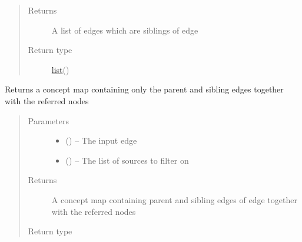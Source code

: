 \documentclass[letterpaper,10pt,english]{sphinxmanual}
\begin{document}
\begin{fulllineitems}
\begin{fulllineitems}
\begin{quote}
\begin{description}
\begin{itemize}
\end{itemize}

\item[{Returns}] \leavevmode
A list of edges which are siblings of edge

\item[{Return type}] \leavevmode
\href{https://docs.python.org/2/library/functions.html\#list}{list}({\hyperref[\detokenize{edge:module-edge}]{}})

\end{description}\end{quote}

\end{fulllineitems}


\begin{fulllineitems}
\label{\detokenize{concept_map:concept_map.ConceptMap.get_partial_map}}
Returns a concept map containing only the parent and sibling edges together with the referred nodes
\begin{quote}\begin{description}
\item[{Parameters}] \leavevmode\begin{itemize}
\item {} 
 ({\hyperref[\detokenize{edge:edge.Edge}]{}}) -- The input edge

\item {} 
 (\href{https://docs.python.org/2/library/functions.html\#list}{}\sphinxstyleliteralemphasis{(}\href{https://docs.python.org/2/library/string.html\#module-string}{}\sphinxstyleliteralemphasis{)}\sphinxstyleliteralemphasis{}) -- The list of sources to filter on

\end{itemize}

\item[{Returns}] \leavevmode
A concept map containing parent and sibling edges of edge together with the referred nodes

\item[{Return type}] \leavevmode
{\hyperref[\detokenize{concept_map:concept_map.ConceptMap}]{}}


\end{description}
\end{quote}
\end{fulllineitems}
\end{fulllineitems}
\end{document}
